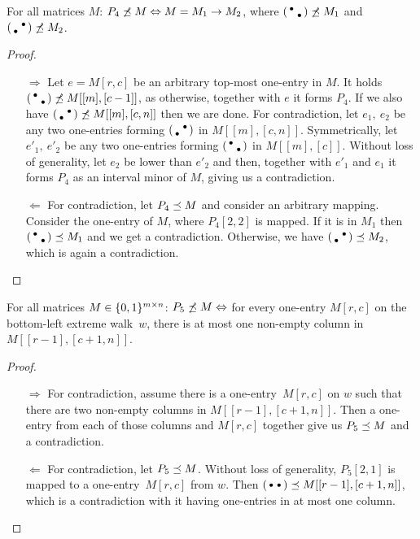 \begin{prop}
For all matrices $M$: $P_4\not\preceq M\Leftrightarrow M=M_1\rightarrow M_2$, where $\left(\begin{smallmatrix}\bullet& \\ &\bullet\end{smallmatrix}\right)\not\preceq M_1$ and $\left(\begin{smallmatrix} &\bullet\\\bullet& \end{smallmatrix}\right)\not\preceq M_2$.
\end{prop}
\begin{proof}
\begin{itemize}
	\item[$\Rightarrow$] Let $e=M[r,c]$ be an arbitrary top-most one-entry in $M$. It holds $\left(\begin{smallmatrix}\bullet& \\ &\bullet\end{smallmatrix}\right)\not\preceq M[[m],[c-1]]$, as otherwise, together with $e$ it forms $P_4$. If we also have $\left(\begin{smallmatrix} &\bullet\\\bullet& \end{smallmatrix}\right)\not\preceq M[[m],[c,n]]$ then we are done. For contradiction, let $e_1,\ e_2$ be any two one-entries forming $\left(\begin{smallmatrix} &\bullet\\\bullet& \end{smallmatrix}\right)$ in $M[[m],[c,n]]$. Symmetrically, let $e'_1,\ e'_2$ be any two one-entries forming $\left(\begin{smallmatrix}\bullet& \\ &\bullet\end{smallmatrix}\right)$ in $M[[m],[c]]$. Without loss of generality, let $e_2$ be lower than $e'_2$ and then, together with $e'_1$ and $e_1$ it forms $P_4$ as an interval minor of $M$, giving us a contradiction. 
	\item[$\Leftarrow$] For contradiction, let $P_4\preceq M$ and consider an arbitrary mapping. Consider the one-entry of $M$, where $P_4[2,2]$ is mapped. If it is in $M_1$ then $\left(\begin{smallmatrix}\bullet& \\ &\bullet\end{smallmatrix}\right)\preceq M_1$ and we get a contradiction. Otherwise, we have $\left(\begin{smallmatrix} &\bullet\\\bullet& \end{smallmatrix}\right)\preceq M_2$, which is again a contradiction.
\end{itemize}
\end{proof}

\begin{prop}
For all matrices $M\in\{0,1\}^{m\times n}$: $P_5\not\preceq M\Leftrightarrow$ for every one-entry $M[r,c]$ on the bottom-left extreme walk~$w$, there is at most one non-empty column in $M[[r-1],[c+1,n]]$.
\end{prop}
\begin{proof}
\begin{itemize}
	\item[$\Rightarrow$] For contradiction, assume there is a one-entry~$M[r,c]$ on $w$ such that there are two non-empty columns in $M[[r-1],[c+1,n]]$. Then a one-entry from each of those columns and $M[r,c]$ together give us $P_5\preceq M$ and a contradiction. 
	\item[$\Leftarrow$] For contradiction, let $P_5\preceq M$. Without loss of generality, $P_5[2,1]$ is mapped to a one-entry~$M[r,c]$ from $w$. Then $\left(\begin{smallmatrix}\bullet&\bullet\end{smallmatrix}\right)\preceq M[[r-1],[c+1,n]]$, which is a contradiction with it having one-entries in at most one column.
\end{itemize}
\end{proof}

